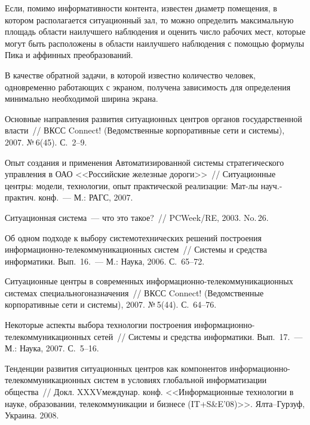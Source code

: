 \begin{multicols}{2}
Если, помимо информативности контента, известен диаметр помещения, в 
котором располагается ситуационный зал, то можно определить 
максимальную площадь области наилучшего наблюдения и оценить число 
рабочих мест, которые могут быть расположены в области наилучшего 
наблюдения с помощью формулы Пика и аффинных преобразований.

В качестве обратной задачи, в которой известно количество человек, 
одновременно работающих с экраном, получена зависимость для 
определения минимально необходимой ширина экрана.

{\small\frenchspacing
{%
\begin{thebibliography}{99}


Основные направления развития ситуационных центров органов государственной 
власти~// ВКСС Connect! (Ведомственные корпоративные сети и системы), 2007. 
№\,6(45). С.~2--9.

Опыт создания и применения Автоматизированной системы стратегического 
управления в ОАО <<Российские железные дороги>>~// Ситуационные центры: 
модели, технологии, опыт практической реализации: Мат-лы науч.-практич. 
конф.~--- М.: РАГС, 2007.

Ситуационная система~--- что это такое?~// PCWeek/RE, 2003. No.\,26.

Об одном подходе к выбору системотехнических решений построения 
информационно-те\-ле\-ком\-му\-никационных систем~// Системы и средства информатики. 
Вып.~16.~--- М.: Наука, 2006. С.~65--72.


Ситуа\-ционные центры в современных информационно-те\-ле\-ком\-му\-ни\-кационных 
системах специального\linebreak назначения~// ВКСС Connect! (Ведомственные корпоративные 
сети и системы), 2007. №\,5(44). С.~64--76.

Некоторые аспекты выбора технологии построения информационно-те\-ле\-ком\-муникационных сетей~// 
Системы и средства информатики. Вып.~17.~--- М.: 
Наука, 2007. С.~5--16.


Тенденции развития ситуационных центров как компонентов информационно-те\-ле\-ком\-му\-ни\-ка\-ционных 
систем в условиях глобальной информатизации общества~// 
Докл. XXXV\linebreak междунар. конф. <<Информационные технологии в науке, 
образовании, телекоммуникации и бизнесе (IT\;+\;S\&E'08)>>. Ялта--Гурзуф, Украина. 
2008.



\end{thebibliography}}}
\end{multicols}
